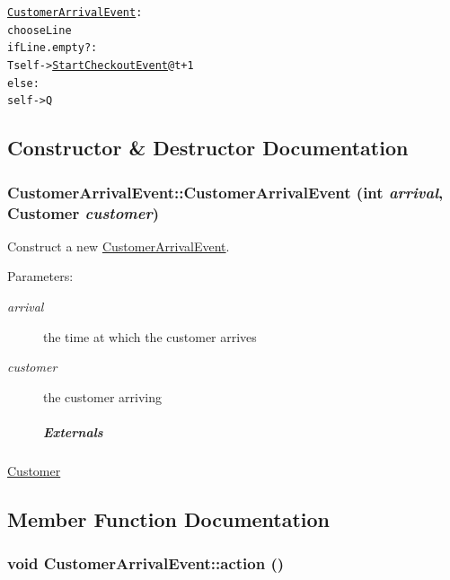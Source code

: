 \small\begin{alltt}
 \hyperlink{class_customer_arrival_event}{CustomerArrivalEvent}:
   choose Line
   if Line.empty?:
     T self -> \hyperlink{class_start_checkout_event}{StartCheckoutEvent} @ t+1
   else:
     self -> Q
 \end{alltt}
\normalsize 
 

\subsection{Constructor \& Destructor Documentation}
\hypertarget{class_customer_arrival_event_c9ca7779a23715f631b7764e047d270a}{
\subsubsection[{CustomerArrivalEvent}]{\setlength{\rightskip}{0pt plus 5cm}CustomerArrivalEvent::CustomerArrivalEvent (int {\em arrival}, \/  {\bf Customer} {\em customer})}}
\label{class_customer_arrival_event_c9ca7779a23715f631b7764e047d270a}


Construct a new \hyperlink{class_customer_arrival_event}{CustomerArrivalEvent}. 

\begin{Desc}
\item[Parameters:]
\begin{description}
\item[{\em arrival}]the time at which the customer arrives \item[{\em customer}]the customer arriving \subparagraph*{Externals}\end{description}
\end{Desc}
\hyperlink{class_customer}{Customer} 

\subsection{Member Function Documentation}
\hypertarget{class_customer_arrival_event_70898c7fa4f92abf462e03b1cd76756b}{
\subsubsection[{action}]{\setlength{\rightskip}{0pt plus 5cm}void CustomerArrivalEvent::action ()}}
\label{class_customer_arrival_event_70898c7fa4f92abf462e03b1cd76756b}


